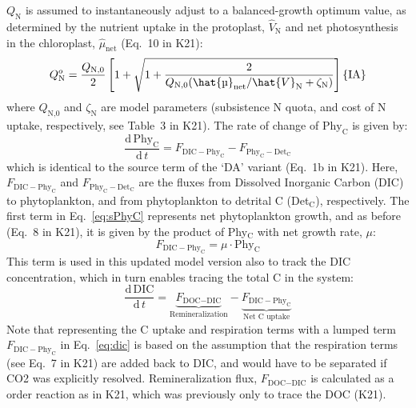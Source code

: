 \documentclass[gmd, manuscript, draft]{copernicus}
\begin{document}
$Q_{\text{N}}$ is assumed to instantaneously adjust to a balanced-growth optimum value, as determined by the nutrient uptake in the protoplast, $\hat{V}_{\text{N}}$ and net photosynthesis in the chloroplast, $\hat{\mu}_{\text{net}}$ (Eq.~10 in K21):
\begin{equation}\label{eq:Qopt}
 Q_{\text{N}}^o= \frac{Q_{\text{N,0}}}{2} \left[1+\sqrt{1+\frac{2}{Q_{\text{N,0}}{({\hat{\mu}_{\text{net}}}/{\hat{V}_{\text{N}}}+\zeta_{\text{N}} )}}} \right] \hfill \{\text{IA}\}
\end{equation}
where $Q_{\text{N,0}}$ and $\zeta_{\text{N}}$ are model parameters (subsistence N quota, and cost of N uptake, respectively, see Table~3 in K21). The rate of change of $\text{Phy}_{\text{C}}$ is given by:
\begin{equation} \label{eq:sPhyC}
\frac{\mathrm{d}\, \text{Phy}_{\text{C}}}{\mathrm{d}\, t} = F_{\text{DIC}-\text{Phy}_{\text{C}}} - F_{\text{Phy}_{\text{C}}-\text{Det}_{\text{C}}}
\end{equation}
which is identical to the source term of the `DA' variant (Eq.~1b in K21). Here, $F_{\text{DIC}-\text{Phy}_{\text{C}}}$ and $F_{\text{Phy}_{\text{C}}-\text{Det}_{\text{C}}}$ are the fluxes from Dissolved Inorganic Carbon (DIC) to phytoplankton, and from phytoplankton to detrital C (Det$_{\text{C}}$), respectively. The first term in Eq.~\eqref{eq:sPhyC} represents net phytoplankton growth, and as before (Eq.~8 in K21), it is given by the product of Phy$_{\text{C}}$ with net growth rate, $\mu$: 
\begin{equation} \label{eq:fdicphyc}
 F_{\text{DIC}-\text{Phy}_{\text{C}}} = \mu \cdot \text{Phy}_{\text{C}}
\end{equation}
This term is used in this updated model version also to track the DIC concentration, which in turn enables tracing the total C in the system:
\begin{equation} \label{eq:dic}
  \frac{\mathrm{d}\, \text{DIC}}{\mathrm{d}\, t} = \underbrace{F_{\text{DOC}-\text{DIC}}}_{\textrm{Remineralization}} - \underbrace{F_{\text{DIC}-\text{Phy}_{\text{C}}}}_{\textrm{Net C uptake}}
\end{equation}
Note that representing the C uptake and respiration terms with a lumped term $F_{\text{DIC}-\text{Phy}_{\text{C}}}$ in Eq.~\eqref{eq:dic} is based on the assumption that the respiration terms (see Eq.~7 in K21) are added back to DIC, and would have to be separated if CO2 was explicitly resolved. Remineralization flux, $F_{\text{DOC}-\text{DIC}}$ is calculated as a order reaction as in K21, which was previously only to trace the DOC (K21).
\end{document}
